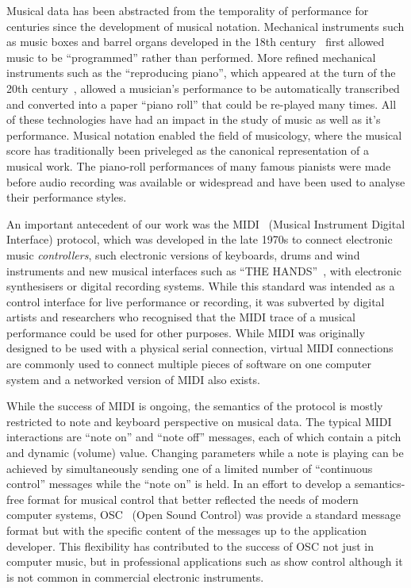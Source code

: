 \documentclass[graybox]{svmult}
\begin{document}
Musical data has been abstracted from the temporality of performance
for centuries since the development of musical notation. Mechanical
instruments such as music boxes and barrel organs developed in the
18th century~\cite{Fowler:1967kq} first allowed music to be
``programmed'' rather than performed. More refined mechanical
instruments such as the ``reproducing piano'', which appeared at the
turn of the 20th century~\cite{Kapur:2005fk}, allowed a musician's performance to be
automatically transcribed and converted into a paper ``piano roll''
that could be re-played many times. All of these technologies have had
an impact in the study of music as well as it's performance. Musical
notation enabled the field of musicology, where the musical score has
traditionally been priveleged as the canonical representation of a
musical work. The piano-roll performances of many famous pianists were
made before audio recording was available or widespread and have been
used to analyse their performance styles.

An important antecedent of our work was the
MIDI~\cite{midi1996complete} (Musical Instrument Digital Interface)
protocol, which was developed in the late 1970s to connect electronic
music \emph{controllers}, such electronic versions of keyboards, drums
and wind instruments and new musical interfaces such as ``THE
HANDS''~\cite{TheHandsArticle}, with electronic synthesisers or
digital recording systems. While this standard was intended as a
control interface for live performance or recording, it was subverted
by digital artists and researchers who recognised that the MIDI trace
of a musical performance could be used for other purposes. While MIDI
was originally designed to be used with a physical serial connection,
virtual MIDI connections are commonly used to connect multiple pieces
of software on one computer system and a networked version of MIDI
also exists\cite{Lazzaro:2004pb}.

While the success of MIDI is ongoing, the semantics of the protocol is
mostly restricted to note and keyboard perspective on musical data.
The typical MIDI interactions are ``note on'' and ``note off''
messages, each of which contain a pitch and dynamic (volume) value.
Changing parameters while a note is playing can be achieved by
simultaneously sending one of a limited number of ``continuous control'' messages while the
``note on'' is held. In an effort to develop a semantics-free format
for musical control that better reflected the needs of modern computer
systems, OSC~\cite{osc-nime2009} (Open Sound Control) was provide a
standard message format but with the specific content of the messages
up to the application developer. This flexibility has contributed to
the success of OSC not just in computer music, but in professional
applications such as show control although it is not common in
commercial electronic instruments. 
\end{document}

